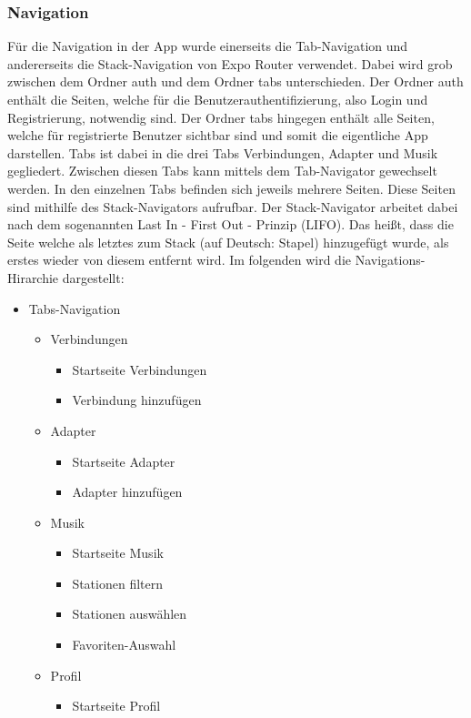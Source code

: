 \documentclass[11pt, twoside]{article}
\begin{document}
\subsubsection{Navigation}
Für die Navigation in der App wurde einerseits die Tab-Navigation und andererseits die Stack-Navigation von Expo Router verwendet. Dabei wird grob zwischen dem Ordner auth und dem Ordner tabs unterschieden. Der Ordner auth enthält die Seiten, welche für die Benutzerauthentifizierung, also Login und Registrierung, notwendig sind. Der Ordner tabs hingegen enthält alle Seiten, welche für registrierte Benutzer sichtbar sind und somit die eigentliche App darstellen. Tabs ist dabei in die drei Tabs Verbindungen, Adapter und Musik gegliedert. Zwischen diesen Tabs kann mittels dem Tab-Navigator gewechselt werden. In den einzelnen Tabs befinden sich jeweils mehrere Seiten. Diese Seiten sind mithilfe des Stack-Navigators aufrufbar. Der Stack-Navigator arbeitet dabei nach dem sogenannten Last In - First Out - Prinzip (LIFO). Das heißt, dass die Seite welche als letztes zum Stack (auf Deutsch: Stapel) hinzugefügt wurde, als erstes wieder von diesem entfernt wird. Im folgenden wird die Navigations-Hirarchie dargestellt:
\begin{itemize}[label=-]
\item Tabs-Navigation
\begin{itemize}[label=-]
\item Verbindungen
\begin{itemize}[label=-]
\item Startseite Verbindungen
\item Verbindung hinzufügen
\end{itemize}
\item Adapter
\begin{itemize}[label=-]
\item Startseite Adapter
\item Adapter hinzufügen
\end{itemize}
\item Musik
\begin{itemize}[label=-]
\item Startseite Musik
\item Stationen filtern
\item Stationen auswählen
\item Favoriten-Auswahl
\end{itemize}
\item Profil
\begin{itemize}[label=-]
\item Startseite Profil
\end{itemize}
\end{itemize}
\end{itemize}
\end{document}
